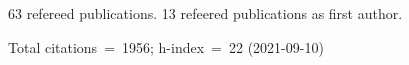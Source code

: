 63 refereed publications. 13 refeered publications as first author.

Total citations~=~1956; h-index~=~22 (2021-09-10)